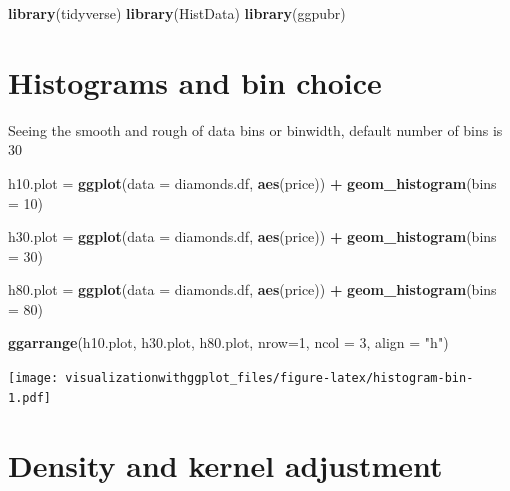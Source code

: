 \documentclass[]{krantz}
\makeatletter
\newenvironment{Shaded}{\begin{snugshade}}{\end{snugshade}}
\newcommand{\DataTypeTok}[1]{\textcolor[rgb]{0.13,0.29,0.53}{#1}}
\newcommand{\DecValTok}[1]{\textcolor[rgb]{0.00,0.00,0.81}{#1}}
\newcommand{\KeywordTok}[1]{\textcolor[rgb]{0.13,0.29,0.53}{\textbf{#1}}}
\newcommand{\NormalTok}[1]{#1}
\newcommand{\OperatorTok}[1]{\textcolor[rgb]{0.81,0.36,0.00}{\textbf{#1}}}
\newcommand{\StringTok}[1]{\textcolor[rgb]{0.31,0.60,0.02}{#1}}
\newenvironment{kframe}{%
\medskip{}
\setlength{\fboxsep}{.8em}
 \def\at@end@of@kframe{}%
 \ifinner\ifhmode%
  \def\at@end@of@kframe{\end{minipage}}%
  \begin{minipage}{\columnwidth}%
 \fi\fi%
 \def\FrameCommand##1{\hskip\@totalleftmargin \hskip-\fboxsep
 \colorbox{shadecolor}{##1}\hskip-\fboxsep
     \hskip-\linewidth \hskip-\@totalleftmargin \hskip\columnwidth}%
 \MakeFramed {\advance\hsize-\width
   \@totalleftmargin\z@ \linewidth\hsize
   \@setminipage}}%
 {\par\unskip\endMakeFramed%
 \at@end@of@kframe}
\renewenvironment{Shaded}{\begin{kframe}}{\end{kframe}}
\makeatother
\begin{document}
\begin{Shaded}
\begin{Highlighting}[]
\KeywordTok{library}\NormalTok{(tidyverse)}
\KeywordTok{library}\NormalTok{(HistData)}
\KeywordTok{library}\NormalTok{(ggpubr)}
\end{Highlighting}
\end{Shaded}

\hypertarget{histograms-and-bin-choice}{%
\section{Histograms and bin choice}\label{histograms-and-bin-choice}}

Seeing the smooth and rough of data
bins or binwidth, default number of bins is 30

\begin{Shaded}
\begin{Highlighting}[]
\NormalTok{h10.plot =}\StringTok{ }\KeywordTok{ggplot}\NormalTok{(}\DataTypeTok{data =}\NormalTok{ diamonds.df, }\KeywordTok{aes}\NormalTok{(price)) }\OperatorTok{+}\StringTok{ }
\StringTok{  }\KeywordTok{geom_histogram}\NormalTok{(}\DataTypeTok{bins =} \DecValTok{10}\NormalTok{) }

\NormalTok{h30.plot =}\StringTok{ }\KeywordTok{ggplot}\NormalTok{(}\DataTypeTok{data =}\NormalTok{ diamonds.df, }\KeywordTok{aes}\NormalTok{(price)) }\OperatorTok{+}\StringTok{ }
\StringTok{  }\KeywordTok{geom_histogram}\NormalTok{(}\DataTypeTok{bins =} \DecValTok{30}\NormalTok{) }

\NormalTok{h80.plot =}\StringTok{ }\KeywordTok{ggplot}\NormalTok{(}\DataTypeTok{data =}\NormalTok{ diamonds.df, }\KeywordTok{aes}\NormalTok{(price)) }\OperatorTok{+}\StringTok{ }
\StringTok{  }\KeywordTok{geom_histogram}\NormalTok{(}\DataTypeTok{bins =} \DecValTok{80}\NormalTok{) }

\KeywordTok{ggarrange}\NormalTok{(h10.plot, h30.plot, h80.plot,}
    \DataTypeTok{nrow=}\DecValTok{1}\NormalTok{, }\DataTypeTok{ncol =} \DecValTok{3}\NormalTok{, }\DataTypeTok{align =} \StringTok{"h"}\NormalTok{)}
\end{Highlighting}
\end{Shaded}

\texttt{[image: visualizationwithggplot\_files/figure-latex/histogram-bin-1.pdf]}

\hypertarget{density-and-kernel-adjustment}{%
\section{Density and kernel adjustment}\label{density-and-kernel-adjustment}}
\end{document}
